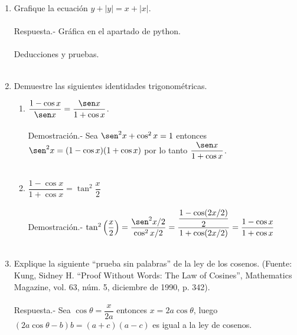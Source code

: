 \begin{enumerate}
\item Grafique la ecuación $y + |y| = x + |x|$.\\\\
    Respuesta.-\; Gráfica en el apartado de python.\\\\

Deducciones y pruebas.\\\\

\item Demuestre las siguientes identidades trigonométricas.

\begin{enumerate}[\bfseries a)]

    \item $\dfrac{1 - \cos x}{\sen x} = \dfrac{\sen x}{1 + \cos x}$.\\\\
	Demostración.-\; Sea $\sen^2 x + \cos^2 x = 1$ entonces $\sen^2 x = (1-\cos x)(1 + \cos x)$ por lo tanto $\dfrac{\sen x}{1 + \cos x}$.\\\\

    \item $\dfrac{1 - \cos x}{1 + \cos x} = \tan^2 \dfrac{x}{2}$\\\\ 
	Demostración.-\; $\tan^2\left(\dfrac{x}{2}\right) = \dfrac{\sen^2 x/2}{\cos^2 x/2} = \dfrac{\dfrac{1-\cos (2x/2)}{2}}{1 + \cos(2x/2)} = \dfrac{1-\cos x}{1 + \cos x}$\\\\

\end{enumerate}

\item Explique la siguiente $“$prueba sin palabras$”$ de la ley de los cosenos. (Fuente: Kung, Sidney H. $“$Proof Without Words: The Law of Cosines$”$, Mathematics Magazine, vol. 63, núm. 5, diciembre de 1990, p. 342).\\\\
    Respuesta.-\; Sea $\cos \theta= \dfrac{x}{2a}$ entonces $x = 2a\cos \theta$, luego $(2a\cos \theta -b)b= (a+c)(a-c)$  es igual a la ley de cosenos.\\\\


\end{enumerate}
